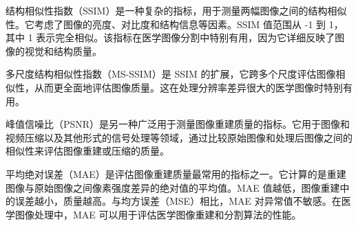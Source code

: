 \documentclass[twocolumn]{article}
\begin{document}
结构相似性指数（SSIM）是一种复杂的指标，用于测量两幅图像之间的结构相似性。它考虑了图像的亮度、对比度和结构信息等因素。SSIM 值范围从 -1 到 1，其中 1 表示完全相似。该指标在医学图像分割中特别有用，因为它详细反映了图像的视觉和结构质量。

多尺度结构相似性指数（MS-SSIM）是 SSIM 的扩展，它跨多个尺度评估图像相似性，从而更全面地评估图像质量。这在处理分辨率差异很大的医学图像时特别有用。

峰值信噪比（PSNR）是另一种广泛用于测量图像重建质量的指标。它用于图像和视频压缩以及其他形式的信号处理等领域，通过比较原始图像和处理后图像之间的相似性来评估图像重建或压缩的质量。

平均绝对误差（MAE）是评估图像重建质量最常用的指标之一。它计算的是重建图像与原始图像之间像素强度差异的绝对值的平均值。MAE 值越低，图像重建中的误差越小，质量越高。与均方误差（MSE）相比，MAE 对异常值不敏感。在医学图像处理中，MAE 可以用于评估医学图像重建和分割算法的性能。





\end{document}
